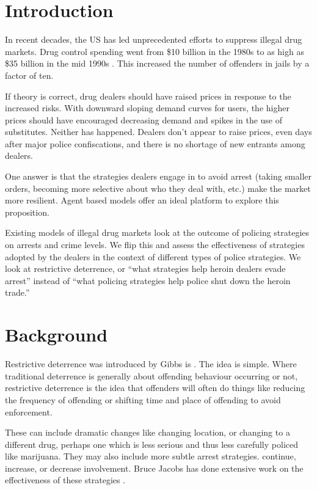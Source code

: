\documentclass[runningheads,a4paper]{llncs}
\begin{document}
\section{Introduction}

In recent decades, the US has led unprecedented efforts to suppress illegal drug markets. Drug control spending went from \$10 billion in the 1980s to as high as \$35 billion in the mid 1990s \cite{bouchard}. This increased the number of offenders in jails by a factor of ten. 


If theory is correct, drug dealers should have raised prices in response to the increased risks. With downward sloping demand curves for users, the higher prices should have encouraged decreasing demand and spikes in the use of substitutes. Neither  has happened. Dealers don't appear to raise prices, even days after major police confiscations, and there is no shortage of new entrants among dealers.

One answer is that the strategies dealers engage in to avoid arrest (taking smaller orders, becoming more selective about who they deal with, etc.) make the market more resilient. Agent based models offer an ideal platform to explore this proposition.

Existing models of illegal drug markets look at the outcome of policing strategies on arrests and crime levels. We flip this and assess the effectiveness of strategies adopted by the dealers in the context of different types of police strategies.
We look at restrictive deterrence, or “what strategies help heroin dealers evade arrest” instead of “what policing strategies help police shut down the heroin trade.”


\section{Background}

Restrictive deterrence was introduced by Gibbs is \cite{Gibbs 1975 paper}. The idea is simple. Where traditional deterrence is generally about offending behaviour occurring or not, restrictive deterrence is the idea that offenders will often do things like reducing the frequency of offending or shifting time and place of offending to avoid enforcement. 

These can include dramatic changes like changing location, or changing to a different drug, perhaps one which is less serious and thus less carefully policed like marijuana. They may also include more subtle arrest strategies.
continue, increase, or decrease involvement. Bruce Jacobs has done extensive work on the effectiveness of these strategies \cite{some of his papers}. %
\end{document}
